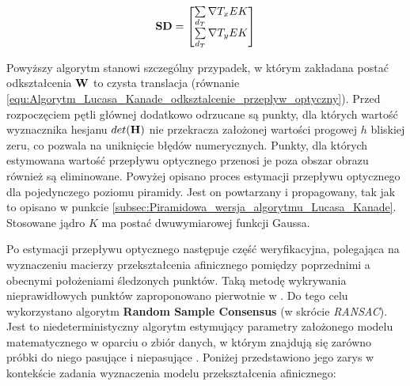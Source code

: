 \begin{equation}
\label{equ:Modul_Lucas_Kanade_najszybszy_spadek}	
	\mathbf{SD} = \begin{bmatrix}
		\sum\limits_{d_T} \nabla T_{x} E K \\
		\sum\limits_{d_T} \nabla T_{y} E K
	\end{bmatrix}
\end{equation}

Powyższy algorytm stanowi szczególny przypadek, w którym zakładana postać odkształcenia $\mathbf{W}$ to czysta translacja (równanie \ref{equ:Algorytm_Lucasa_Kanade_odksztalcenie_przeplyw_optyczny}). Przed rozpoczęciem pętli głównej dodatkowo odrzucane są punkty, dla których wartość wyznacznika hesjanu $det(\mathbf{H})$ nie przekracza założonej wartości progowej $h$ bliskiej zeru, co pozwala na uniknięcie błędów numerycznych. Punkty, dla których estymowana wartość przepływu optycznego przenosi je poza obszar obrazu również są eliminowane. Powyżej opisano proces estymacji przepływu optycznego dla pojedynczego poziomu piramidy. Jest on powtarzany i propagowany, tak jak to opisano w punkcie \ref{subsec:Piramidowa_wersja_algorytmu_Lucasa_Kanade}. Stosowane jądro $K$ ma postać dwuwymiarowej funkcji Gaussa. 

Po estymacji przepływu optycznego następuje część weryfikacyjna, polegająca na wyznaczeniu macierzy przekształcenia afinicznego pomiędzy poprzednimi a obecnymi położeniami śledzonych punktów. Taką metodę wykrywania nieprawidłowych punktów zaproponowano pierwotnie w \cite{Shi1994}. Do tego celu wykorzystano algorytm \textbf{Random Sample Consensus} (w skrócie \textit{RANSAC}). Jest to niedeterministyczny algorytm estymujący parametry założonego modelu matematycznego w oparciu o zbiór danych, w którym znajdują się zarówno próbki do niego pasujące i niepasujące \cite{Hartley2004}. Poniżej przedstawiono jego zarys w kontekście zadania wyznaczenia modelu przekształcenia afinicznego:

